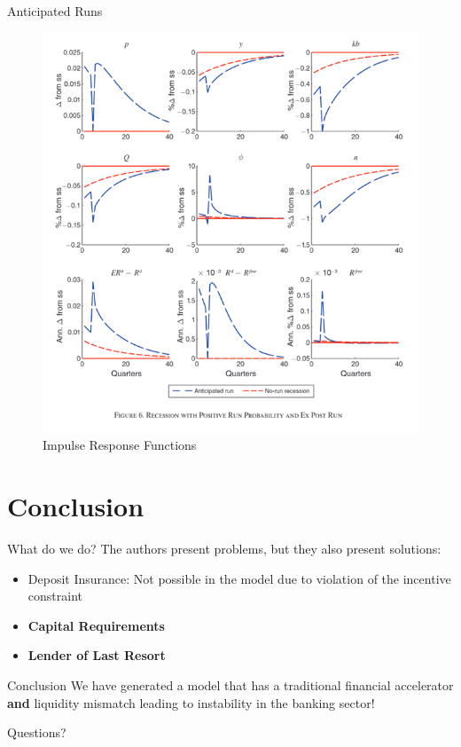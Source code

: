 \documentclass[
	11pt, %
	aspectratio=169, %
]{beamer}
\begin{document}
\begin{frame}{Anticipated Runs}
\begin{figure}
    \centering
    \includegraphics[scale=0.35]{run_case_expected.png}
    \caption{Impulse Response Functions}
    \label{fig:irf_anticipated}
\end{figure}
\end{frame}
\section{Conclusion}
\begin{frame}{What do we do?}
    The authors present problems, but they also present solutions:
    \begin{itemize}
        \item Deposit Insurance: Not possible  in the model due to violation of the incentive constraint
        \item \textbf{Capital Requirements}
        \item \textbf{Lender of Last Resort}
    \end{itemize}
\end{frame}
\begin{frame}{Conclusion}
    We have generated a model that has a traditional financial accelerator \textbf{and} liquidity mismatch leading to instability in the banking sector! 

    \bigbreak
    \begin{center}
        Questions?
    \end{center}
\end{frame}
\end{document}
